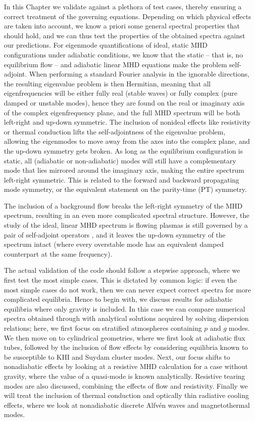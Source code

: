 In this Chapter we validate {\legolas} against a plethora of test cases, thereby ensuring a correct treatment of the governing equations. Depending on which physical effects are taken into account, we know a priori some general spectral properties that should hold, and we can thus test the properties of the obtained spectra against our predictions. For eigenmode quantifications of ideal, static MHD configurations under adiabatic conditions, we know that the static -- that is, no equilibrium flow -- and adiabatic linear MHD equations make the problem self-adjoint. When performing a standard Fourier analysis in the ignorable directions, the resulting eigenvalue problem is then Hermitian, meaning that all eigenfrequencies will be either fully real (stable waves) or fully complex (pure damped or unstable modes), hence they are found on the real or imaginary axis of the complex eigenfrequency plane, and the full MHD spectrum will be both left-right and up-down symmetric. The inclusion of nonideal effects like resistivity or thermal conduction lifts the self-adjointness of the eigenvalue problem, allowing the eigenmodes to move away from the axes into the complex plane, and the up-down symmetry gets broken. As long as the equilibrium configuration is static, all (adiabatic or non-adiabatic) modes will still have a complementary mode that lies mirrored around the imaginary axis, making the entire spectrum left-right symmetric. This is related to the forward and backward propagating mode symmetry, or the equivalent statement on the parity-time (PT) symmetry.

The inclusion of a background flow breaks the left-right symmetry of the MHD spectrum, resulting in an even more complicated spectral structure. However, the study of the ideal, linear MHD spectrum is flowing plasmas is still governed by a pair of self-adjoint operators \citep{goedbloed2011,book_MHD}, and it leaves the up-down symmetry of the spectrum intact (where every overstable mode has an equivalent damped counterpart at the same frequency).

The actual validation of the code should follow a stepwise approach, where we first test the most simple cases. This is dictated by common logic: if even the most simple cases do not work, then we can never expect correct spectra for more complicated equilibria. Hence to begin with, we discuss results for adiabatic equilibria where only gravity is included. In this case we can compare numerical spectra obtained through {\legolas} with analytical solutions acquired by solving dispersion relations; here, we first focus on stratified atmospheres containing $p$ and $g$ modes. We then move on to cylindrical geometries, where we first look at adiabatic flux tubes, followed by the inclusion of flow effects by considering equilibria known to be susceptible to KHI and Suydam cluster modes. Next, our focus shifts to nonadiabatic effects by looking at a resistive MHD calculation for a case without gravity, where the value of a quasi-mode is known analytically. Resistive tearing modes are also discussed, combining the effects of flow and resistivity. Finally we will treat the inclusion of thermal conduction and optically thin radiative cooling effects, where we look at nonadiabatic discrete Alfv\'en waves and magnetothermal modes.


